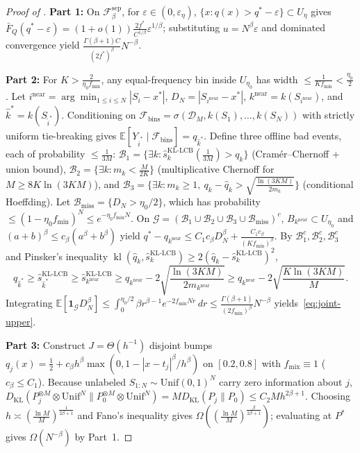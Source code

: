 \documentclass{article}
\theoremstyle{plain}
\theoremstyle{definition}
\theoremstyle{remark}
\newcommand{\E}{\mathbb{E}}
\newcommand{\KL}{\operatorname{kl}}
\newcommand{\DKL}{D_{\mathrm{KL}}}
\newcommand{\ind}{\mathbf{1}}
\newcommand{\fmix}{f_{\mathrm{mix}}}
\begin{document}
\begin{proof}[Proof of ]
\textbf{Part 1:} On $\mathcal{F}_\beta^{\mathrm{sep}}$, for $\varepsilon \in (0, \varepsilon_\eta)$, $\{x : q(x) > q^* - \varepsilon\} \subset U_\eta$ gives $\bar{F}_Q(q^* - \varepsilon) = (1+o(1))\frac{2f^*}{C^{1/\beta}}\varepsilon^{1/\beta}$; substituting $u = N^\beta\varepsilon$ and dominated convergence yield $\frac{\Gamma(\beta+1)C}{(2f^*)^\beta}N^{-\beta}$.

\textbf{Part 2:} For $K > \frac{2}{\eta_0 f_{\min}}$, any equal-frequency bin inside $U_{\eta_0}$ has width $\le \frac{1}{K f_{\min}} < \frac{\eta_0}{2}$. Let $i^{\mathrm{near}} = \arg\min_{1\le i\le N}|S_i - x^*|$, $D_N = |S_{i^{\mathrm{near}}} - x^*|$, $k^{\mathrm{near}} = k(S_{i^{\mathrm{near}}})$, and $\hat{k}^* = k(S_{\hat{i}^*})$. Conditioning on $\mathcal{F}_{\mathrm{bins}} = \sigma(\mathcal{D}_M, k(S_1),\dots,k(S_N))$ with strictly uniform tie-breaking gives $\E[Y_{\hat{i}^*} \mid \mathcal{F}_{\mathrm{bins}}] = q_{\hat{k}^*}$. Define three offline bad events, each of probability $\le \frac{1}{3M}$: $\mathcal{B}_1 = \{\exists k: \hat{s}_k^{\mathrm{KL\text{-}LCB}}(\frac{1}{3M}) > q_k\}$ (Cram\'er--Chernoff + union bound), $\mathcal{B}_2 = \{\exists k: m_k < \frac{M}{2K}\}$ (multiplicative Chernoff for $M \ge 8K\ln(3KM)$), and $\mathcal{B}_3 = \{\exists k: m_k \ge 1,\ q_k - \hat{q}_k > \sqrt{\frac{\ln(3KM)}{2m_k}}\}$ (conditional Hoeffding). Let $\mathcal{B}_{\mathrm{miss}} = \{D_N > \eta_0/2\}$, which has probability $\le (1 - \eta_0 f_{\min})^N \le e^{-\eta_0 f_{\min}N}$. On $\mathcal{G} = (\mathcal{B}_1 \cup \mathcal{B}_2 \cup \mathcal{B}_3 \cup \mathcal{B}_{\mathrm{miss}})^c$, $B_{k^{\mathrm{near}}} \subset U_{\eta_0}$ and $(a+b)^\beta \le c_\beta(a^\beta + b^\beta)$ yield $q^* - q_{k^{\mathrm{near}}} \le C_1 c_\beta D_N^\beta + \frac{C_1 c_\beta}{(K f_{\min})^\beta}$. By $\mathcal{B}_1^c, \mathcal{B}_2^c, \mathcal{B}_3^c$ and Pinsker's inequality $\KL(\hat{q}_k, \hat{s}_k^{\mathrm{KL\text{-}LCB}}) \ge 2(\hat{q}_k - \hat{s}_k^{\mathrm{KL\text{-}LCB}})^2$,
\[
q_{\hat{k}^*} \ge \hat{s}_{\hat{k}^*}^{\mathrm{KL\text{-}LCB}} \ge \hat{s}_{k^{\mathrm{near}}}^{\mathrm{KL\text{-}LCB}} \ge q_{k^{\mathrm{near}}} - 2\sqrt{\frac{\ln(3KM)}{2m_{k^{\mathrm{near}}}}} \ge q_{k^{\mathrm{near}}} - 2\sqrt{\frac{K\ln(3KM)}{M}}.
\]
Integrating $\E[\ind_{\mathcal{G}}D_N^\beta] \le \int_0^{\eta_0/2}\beta r^{\beta-1}e^{-2f_{\min}Nr}\,dr \le \frac{\Gamma(\beta+1)}{(2f_{\min})^\beta}N^{-\beta}$ yields~\eqref{eq:joint-upper}.

\textbf{Part 3:} Construct $J = \Theta(h^{-1})$ disjoint bumps $q_j(x) = \frac{1}{2} + c_\beta h^\beta\max(0, 1 - |x-t_j|^\beta/h^\beta)$ on $[0.2, 0.8]$ with $\fmix \equiv 1$ ($c_\beta \le C_1$). Because unlabeled $S_{1:N} \sim \mathrm{Unif}(0,1)^N$ carry zero information about $j$, $\DKL(P_j^{\otimes M}\otimes\mathrm{Unif}^N \| P_0^{\otimes M}\otimes\mathrm{Unif}^N) = M\DKL(P_j\|P_0) \le C_2 M h^{2\beta+1}$. Choosing $h \asymp (\frac{\ln M}{M})^{\frac{1}{2\beta+1}}$ and Fano's inequality gives $\Omega((\frac{\ln M}{M})^{\frac{\beta}{2\beta+1}})$; evaluating at $P^*$ gives $\Omega(N^{-\beta})$ by Part~1.
\end{proof}
\end{document}
